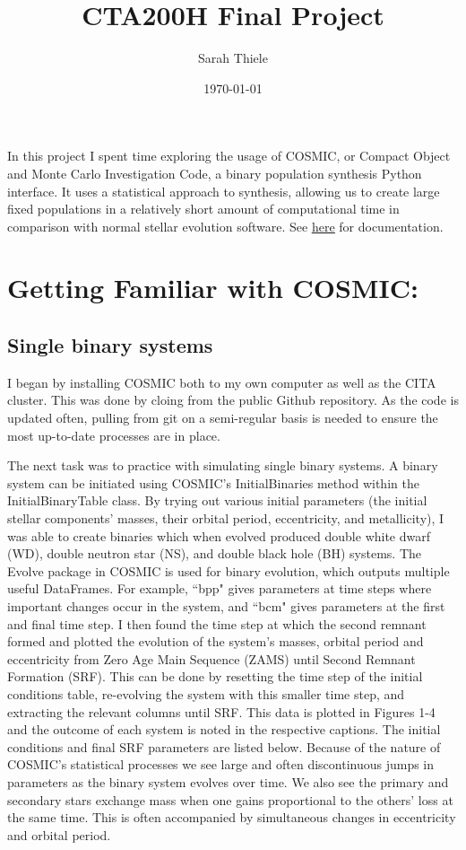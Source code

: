 \documentclass[12pt]{article}
\title{CTA200H Final Project}
\author{Sarah Thiele}
\date{\today}
\begin{document}
\maketitle

In this project I spent time exploring the usage of COSMIC, or Compact Object and Monte Carlo Investigation Code, a binary population synthesis Python interface. It uses a statistical approach to synthesis, allowing us to create large fixed populations in a relatively short amount of computational time in comparison with normal stellar evolution software. See   \href{https://cosmic-popsynth.github.io/docs/latest/index.html}{\color{blue}\uline{here}} for documentation.

\section{Getting Familiar with COSMIC:}
\subsection{Single binary systems}

I began by installing COSMIC both to my own computer as well as the CITA cluster. This was done by cloing from the public Github repository. As the code is updated often, pulling from git on a semi-regular basis is needed to ensure the most up-to-date processes are in place. 

The next task was to practice with simulating single binary systems. A binary system can be initiated using COSMIC's InitialBinaries method within the InitialBinaryTable class. By trying out various initial parameters (the initial stellar components' masses, their orbital period, eccentricity, and metallicity), I was able to create binaries which when evolved produced double white dwarf (WD), double neutron star (NS), and double black hole (BH) systems. The Evolve package in COSMIC is used for binary evolution, which outputs multiple useful DataFrames. For example, ``bpp" gives parameters at time steps where important changes occur in the system, and ``bcm" gives parameters at the first and final time step. I then found the time step at which the second remnant formed and plotted the evolution of the system's masses, orbital period and eccentricity from Zero Age Main Sequence (ZAMS) until Second Remnant Formation (SRF). This can be done by resetting the time step of the initial conditions table, re-evolving the system with this smaller time step, and extracting the relevant columns until SRF. This data is plotted in Figures 1-4 and the outcome of each system is noted in the respective captions. The initial conditions and final SRF parameters are listed below. Because of the nature of COSMIC's statistical processes we see large and often discontinuous jumps in parameters as the binary system evolves over time. We also see the primary and secondary stars exchange mass when one gains proportional to the others' loss at the same time. This is often accompanied by simultaneous changes in eccentricity and orbital period.
\end{document}
